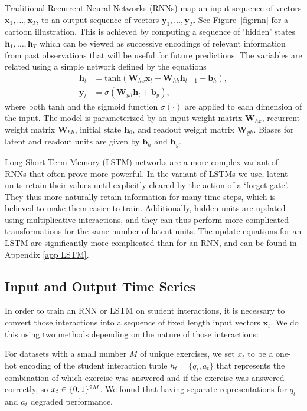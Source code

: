 \documentclass{article} \usepackage{nips,times}
\newcommand{\mb}{\mathbf}
\newcommand{\mc}{\mathcal}
\begin{document}
Traditional Recurrent Neural Networks (RNNs) map an input sequence of vectors $\mb x_1, \dots ,\mb x_T$, to an output sequence of vectors $\mb y_1,\dots,\mb y_T$. See Figure~\ref{fig:rnn} for a cartoon illustration. This is achieved by computing a sequence of `hidden' states $\mb h_1 , \dots , \mb h_T$  which can be viewed as successive encodings of relevant information from past observations that will be useful for future predictions. The variables are related using a simple network defined by the equations
\begin{align}
    \mb h_t &= \mathrm{tanh}\left(\mb W_{hx} \mb x_t + \mb W_{hh} \mb h_{t-1} + \mb b_h\right), \\
    \mb y_t &= \sigma\left(\mb W_{yh} \mb h_t + \mb b_y\right),
\end{align}
where both $\mathrm{tanh}$ and the sigmoid function $\sigma\left(\cdot\right)$ are applied to each dimension of the input.
The model is parameterized by an input weight matrix $\mb W_{hx}$, recurrent weight matrix $\mb W_{hh}$, initial state $\mb h_0$, and readout weight matrix $\mb W_{yh}$.
Biases for latent and readout units are given by $\mb b_h$ and $\mb b_y$.


Long Short Term Memory (LSTM) networks \cite{hochreiter1997long} are a more complex variant of RNNs that often prove more powerful.
In the variant of LSTMs we use, latent units retain their values until explicitly cleared by the action of a `forget gate'.
They thus more naturally retain information for many time steps, which is believed to make them easier to train.
Additionally, hidden units are updated using multiplicative interactions, and they can thus perform more complicated transformations for the same number of latent units.
The update equations for an LSTM are significantly more complicated than for an RNN, and can be found in Appendix \ref{app LSTM}.


\subsection{Input and Output Time Series}

In order to train an RNN or LSTM on student interactions, it is necessary to convert those interactions into a sequence of fixed length input vectors $\mb x_t$.
We do this using two methods depending on the nature of those interactions:



For datasets with a small number $M$ of unique exercises, we set $x_t$ to be a one-hot encoding of the student interaction tuple $h_t = \{q_t, a_t\}$ that represents the combination of which exercise was answered and if the exercise was answered correctly, so $x_t \in \mc \{0,1\}^{2M}$. We found that having separate representations for $q_t$ and $a_t$ degraded performance.
\end{document}

